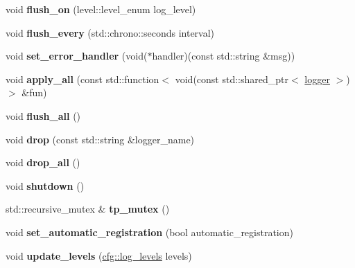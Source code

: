 \begin{DoxyCompactItemize}
\mbox{\label{classspdlog_1_1details_1_1registry_a209c92d89b1872573f077c86435e0d83}} 
void {\bfseries flush\+\_\+on} (level\+::level\+\_\+enum log\+\_\+level)
\item 
\mbox{\label{classspdlog_1_1details_1_1registry_a402d426d6d19e7999bfe19517cd7c52d}} 
void {\bfseries flush\+\_\+every} (std\+::chrono\+::seconds interval)
\item 
\mbox{\label{classspdlog_1_1details_1_1registry_a7b6a809825633a78d8daf658a4b5b3b3}} 
void {\bfseries set\+\_\+error\+\_\+handler} (void($\ast$handler)(const std\+::string \&msg))
\item 
\mbox{\label{classspdlog_1_1details_1_1registry_ae227e31ce64b5568e31170927ee3fb5c}} 
void {\bfseries apply\+\_\+all} (const std\+::function$<$ void(const std\+::shared\+\_\+ptr$<$ \hyperlink{classspdlog_1_1logger}{logger} $>$)$>$ \&fun)
\item 
\mbox{\label{classspdlog_1_1details_1_1registry_ab0a55ecfe3ded390d9d08303376de835}} 
void {\bfseries flush\+\_\+all} ()
\item 
\mbox{\label{classspdlog_1_1details_1_1registry_a54dd23ca57f53e6d74340f6853853130}} 
void {\bfseries drop} (const std\+::string \&logger\+\_\+name)
\item 
\mbox{\label{classspdlog_1_1details_1_1registry_a301f502d1af4425459674b6f2f0280b5}} 
void {\bfseries drop\+\_\+all} ()
\item 
\mbox{\label{classspdlog_1_1details_1_1registry_aa9844e5a01050826006c1db130f5f29f}} 
void {\bfseries shutdown} ()
\item 
\mbox{\label{classspdlog_1_1details_1_1registry_a5367ffce169c5adaecee78cb573db9d7}} 
std\+::recursive\+\_\+mutex \& {\bfseries tp\+\_\+mutex} ()
\item 
\mbox{\label{classspdlog_1_1details_1_1registry_a47c0702d31d07e2a9c503954d3d2aa62}} 
void {\bfseries set\+\_\+automatic\+\_\+registration} (bool automatic\+\_\+registration)
\item 
\mbox{\label{classspdlog_1_1details_1_1registry_ae2e38ba138aeec562fc50b1e82316bac}} 
void {\bfseries update\+\_\+levels} (\hyperlink{classspdlog_1_1cfg_1_1log__levels}{cfg\+::log\+\_\+levels} levels)
\end{DoxyCompactItemize}
